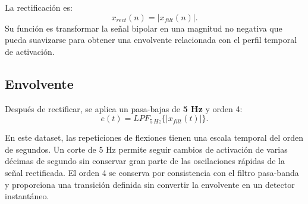 \documentclass[11pt,spanish]{article}
\begin{document}
La rectificación es:
\begin{equation}
x_{rect}(n)=|x_{filt}(n)|.
\end{equation}
Su función es transformar la señal bipolar en una magnitud no negativa que pueda suavizarse para obtener una envolvente relacionada con el perfil temporal de activación.

\subsection{Envolvente}

Después de rectificar, se aplica un pasa-bajas de \textbf{5 Hz} y orden 4:
\begin{equation}
e(t)=LPF_{5\,Hz}\{|x_{filt}(t)|\}.
\end{equation}

En este dataset, las repeticiones de flexiones tienen una escala temporal del orden de segundos. Un corte de 5 Hz permite seguir cambios de activación de varias décimas de segundo sin conservar gran parte de las oscilaciones rápidas de la señal rectificada.
El orden 4 se conserva por consistencia con el filtro pasa-banda y proporciona una transición definida sin convertir la envolvente en un detector instantáneo.


\end{document}
